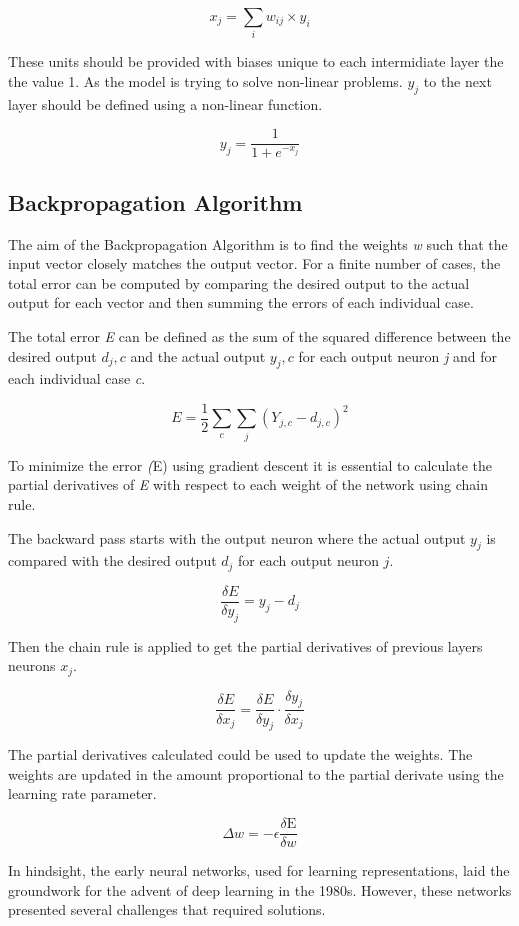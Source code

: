 \documentclass[a4paper,12pt]{Classes/RoboticsLaTeX}
\begin{document}
	\[ x_j = \sum_i w_{ij} \times y_i \]

	These units should be provided with biases unique to each intermidiate layer the the value 1. As the model is trying to solve non-linear problems. $\textit{y}_j$ to the next layer
	should be defined using a non-linear function.
	
	\[y_j = \frac{1}{1 + e^{-x_j}}\]

	
	\subsection{Backpropagation Algorithm}

	The aim of the Backpropagation Algorithm is to find the weights \textit{w} such that the input vector closely matches the output vector. For a finite number of cases, the total error can be computed by comparing the desired output 
	to the actual output for each vector and then summing the errors of each individual case.

	The total error \textit{E} can be defined as the sum of the squared difference between the desired output $\textit{d}_j,c$ and the actual output 
	$\textit{y}_j,c$ for each output neuron \textit{j} and for each individual case \textit{c}.


	\[E = \frac{1}{2} \sum_{c} \sum_{j} (Y_{j,c} - d_{j,c})^2\]

	To minimize the error \textit(E) using gradient descent it is essential to calculate the partial derivatives of \textit{E} with respect to each weight of the network using chain rule.

	The backward pass starts with the output neuron where the actual output \(y_j\) is compared with the desired output \(d_j\) for each output neuron \(j\). 

	\[\frac{\delta E}{\delta y_j} = y_j - d_j\]

	Then the chain rule is applied to get the partial derivatives of previous layers neurons \(x_j\).

	\[\frac{\delta E}{\delta x_j} = \frac{\delta E}{\delta y_j} \cdot \frac{\delta y_j}{\delta x_j}\]


	The partial derivatives calculated could be used to update the weights. The weights are updated in the amount proportional to the partial derivate using the learning rate parameter.

	\[\Delta w = -\epsilon \frac{\delta \text{E}}{\delta w}\]

	In hindsight, the early neural networks, used for learning representations, laid the groundwork for the advent of deep learning in the 1980s. However, these networks presented several challenges that required solutions.
\end{document}
